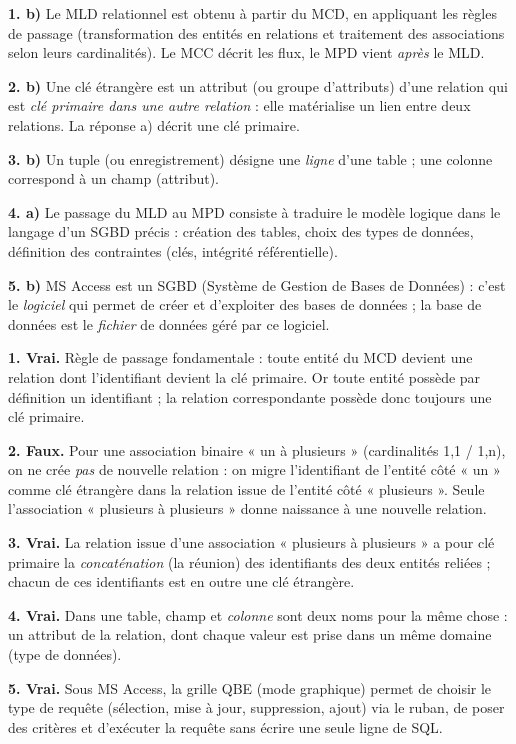 \documentclass[11pt]{article}
\newcommand{\cle}[1]{{\popxbold\color{popdark}#1}}
\begin{document}
\begin{corrige}
\textbf{1. b)} Le MLD relationnel est obtenu à partir du \cle{MCD}, en appliquant les règles de passage (transformation des entités en relations et traitement des associations selon leurs cardinalités). Le MCC décrit les flux, le MPD vient \emph{après} le MLD.

\textbf{2. b)} Une \cle{clé étrangère} est un attribut (ou groupe d'attributs) d'une relation qui est \emph{clé primaire dans une autre relation} : elle matérialise un lien entre deux relations. La réponse a) décrit une clé primaire.

\textbf{3. b)} Un \cle{tuple} (ou enregistrement) désigne une \emph{ligne} d'une table ; une colonne correspond à un champ (attribut).

\textbf{4. a)} Le passage du MLD au \cle{MPD} consiste à traduire le modèle logique dans le langage d'un SGBD précis : création des tables, choix des types de données, définition des contraintes (clés, intégrité référentielle).

\textbf{5. b)} MS Access est un \cle{SGBD} (Système de Gestion de Bases de Données) : c'est le \emph{logiciel} qui permet de créer et d'exploiter des bases de données ; la base de données est le \emph{fichier} de données géré par ce logiciel.
\end{corrige}

\begin{corrige}
\textbf{1. Vrai.} Règle de passage fondamentale : toute entité du MCD devient une relation dont l'identifiant devient la clé primaire. Or toute entité possède par définition un identifiant ; la relation correspondante possède donc toujours une clé primaire.

\textbf{2. Faux.} Pour une association binaire « un à plusieurs » (cardinalités 1,1 / 1,n), on ne crée \emph{pas} de nouvelle relation : on migre l'identifiant de l'entité côté « un » comme clé étrangère dans la relation issue de l'entité côté « plusieurs ». Seule l'association « plusieurs à plusieurs » donne naissance à une nouvelle relation.

\textbf{3. Vrai.} La relation issue d'une association « plusieurs à plusieurs » a pour clé primaire la \emph{concaténation} (la réunion) des identifiants des deux entités reliées ; chacun de ces identifiants est en outre une clé étrangère.

\textbf{4. Vrai.} Dans une table, \cle{champ} et \emph{colonne} sont deux noms pour la même chose : un attribut de la relation, dont chaque valeur est prise dans un même domaine (type de données).

\textbf{5. Vrai.} Sous MS Access, la grille QBE (mode graphique) permet de choisir le type de requête (sélection, mise à jour, suppression, ajout) via le ruban, de poser des critères et d'exécuter la requête sans écrire une seule ligne de SQL.
\end{corrige}
\end{document}
